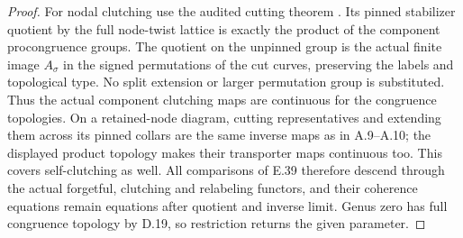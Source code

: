 \begin{proof}
For nodal clutching use the audited cutting theorem
\cite[Theorem 4.5, pp.~17--19]{ET_Boggi2014}.  Its pinned
stabilizer quotient by the full node-twist lattice is
exactly the product of the component procongruence
groups.  The quotient on the unpinned group is the actual
finite image $A_\sigma$ in the signed permutations of
the cut curves, preserving the labels and topological
type.  No split extension or larger permutation group
is substituted.  Thus the actual component clutching
maps are continuous for the congruence topologies.
On a retained-node diagram, cutting representatives
and extending them across its pinned collars are the
same inverse maps as in A.9--A.10; the displayed product
topology makes their transporter maps continuous too.
This covers self-clutching as well.  All comparisons of
E.39 therefore descend through the actual forgetful,
clutching and relabeling functors, and their coherence
equations remain equations after quotient and inverse
limit.  Genus zero has full congruence topology by D.19,
so restriction returns the given parameter.
\end{proof}

